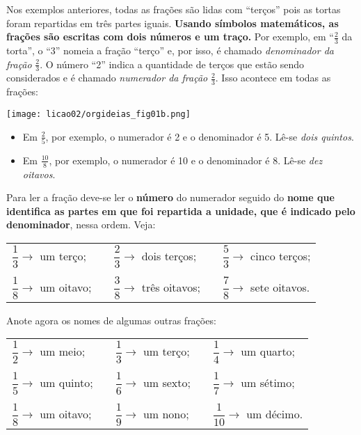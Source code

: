 Nos exemplos anteriores, todas as frações são lidas com ``terços'' pois as tortas foram repartidas em três partes iguais. \textbf{Usando símbolos matemáticos, as frações são escritas com dois números e um traço.} Por exemplo, em ``$\frac{2}{3}$ da torta'', o ``3'' nomeia a fração ``terço'' e, por isso, é chamado \textit{denominador da fração} $\frac{2}{3}$. O número ``2'' indica a quantidade de terços que estão sendo considerados e é chamado \textit{numerador da fração} $\frac{2}{3}$. Isso acontece em todas as frações:

\begin{center}
  \texttt{[image: licao02/orgideias\_fig01b.png]}
\end{center}

\begin{itemize}
\item Em $\frac{2}{5}$, por exemplo, o numerador é 2 e o denominador é 5. Lê-se \textit{{dois quintos}}.
\item Em $\frac{10}{8}$, por exemplo, o numerador é 10 e o denominador é 8. Lê-se \textit{{ dez oitavos}}.
\end{itemize}


Para ler a fração deve-se ler o {\bfseries número} do numerador seguido do {\bfseries nome que identifica as partes em que foi repartida a unidade, que é indicado pelo denominador}, nessa ordem. Veja:

\begin{center}
\begin{tabular}[c]{lclcl}
  $\dfrac{1}{3}\rightarrow$ um terço;& \quad & $\dfrac{2}{3}\rightarrow$ dois terços; & \quad & $\dfrac{5}{3}\rightarrow$ cinco terços; \\
  \\
$\dfrac{1}{8}\rightarrow$ um oitavo;& \quad & $\dfrac{3}{8}\rightarrow$ três oitavos; & \quad & $\dfrac{7}{8}\rightarrow$ sete oitavos.  
\end{tabular}
\end{center}

Anote agora os nomes de algumas outras frações:

\begin{center}
  \begin{tabular}[c]{lclcl}
    $\dfrac{1}{2}\rightarrow$  um meio; & \quad & $\dfrac{1}{3}\rightarrow$   um terço; & \quad &  $\dfrac{1}{4}\rightarrow$ um quarto;\\
    \\
    $\dfrac{1}{5}\rightarrow$   um quinto; & \quad &  $\dfrac{1}{6}\rightarrow$  um sexto; & \quad & $\dfrac{1}{7}\rightarrow$  um sétimo;\\
    \\
$\dfrac{1}{8}\rightarrow$   um oitavo; & \quad & $\dfrac{1}{9}\rightarrow$  um nono; & \quad & $\dfrac{1}{10}\rightarrow$   um décimo.
  \end{tabular}
\end{center}

